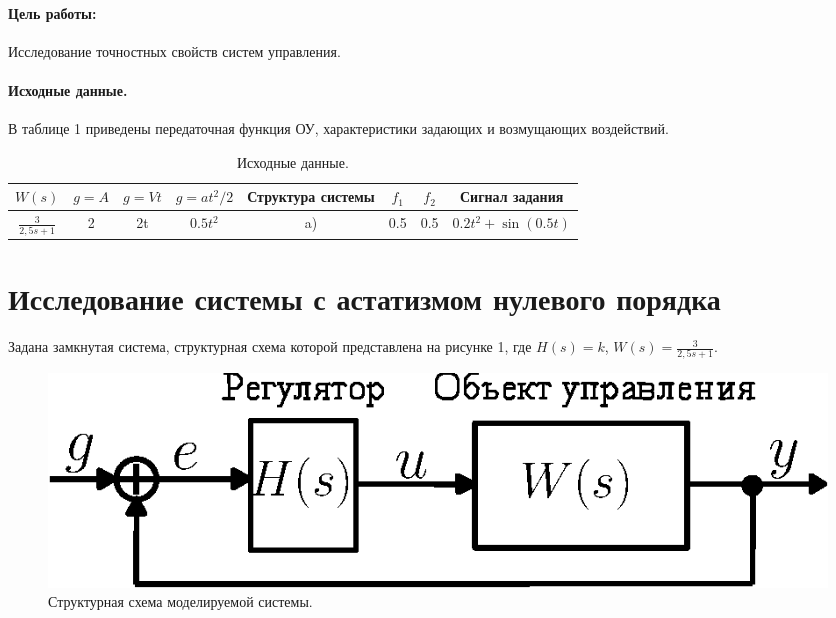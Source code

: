 \documentclass[12pt,a4paper]{article}
\begin{document}


\paragraph{Цель работы:}Исследование точностных свойств систем управления.%
\paragraph{Исходные данные.} В таблице 1 приведены передаточная функция ОУ, характеристики задающих и возмущающих воздействий.
\begin{table}[h!]
	\caption{Исходные данные.}
	\renewcommand{\arraystretch}{1.8} %
	\begin{tabular}{|c|c|c|c|c|c|c|c|}
		\hline $W(s)$ & $g = A$ & $g = Vt$ & $g = at^2/2$ & Структура системы & $f_1$ & $f_2$ & Сигнал задания\\
		\hline $\displaystyle{\frac{3}{2,5s + 1}}$ & 2 & 2t & $0.5t^2$ & a) & 0.5 & 0.5 & $0.2t^2 + \sin{(0.5t)}$\\
		\hline
	\end{tabular}	
\end{table} 

\newpage
\section*{Исследование системы с астатизмом нулевого порядка}
Задана замкнутая система, структурная схема которой представлена на рисунке 1, где $H(s) = k$, $W(s)=\displaystyle{\frac{3}{2,5s + 1}}$.
\begin{figure}[h!]
	\centering
	\includegraphics[width=0.6\linewidth]{cxema0.eps}
	\caption{Структурная схема моделируемой системы.}
\end{figure}
\end{document}
